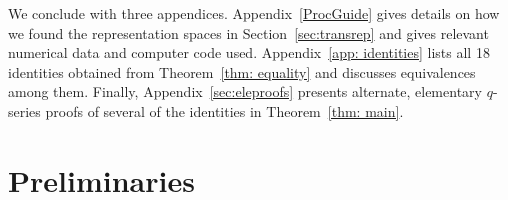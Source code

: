 \documentclass[11pt,reqno]{amsart}
\renewcommand{\=}{\;=\;}
\theoremstyle{myremark}
\begin{document}
We conclude with three appendices. Appendix~\ref{ProcGuide} gives details on how we found the representation spaces in Section~\ref{sec:transrep} and gives relevant numerical data and computer code used.
Appendix~\ref{app: identities} lists all 18 identities obtained from Theorem~\ref{thm: equality} and discusses equivalences among them. 
Finally, Appendix~\ref{sec:eleproofs} presents alternate, elementary $q$-series proofs of several of the identities in Theorem~\ref{thm: main}.


\section{Preliminaries}
\label{sec:prelim}
\end{document}
